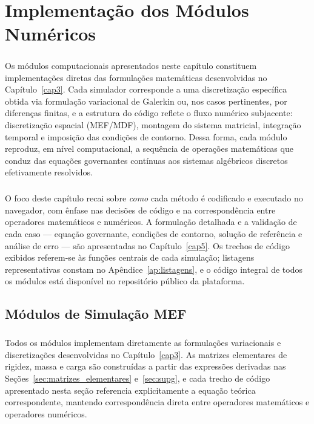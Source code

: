 \chapter{Implementação dos Módulos Numéricos}
\label{cap:implementacao}

\paragraph{}Os módulos computacionais apresentados neste capítulo constituem implementações diretas das formulações matemáticas desenvolvidas no Capítulo~\ref{cap3}. Cada simulador corresponde a uma discretização específica obtida via formulação variacional de Galerkin ou, nos casos pertinentes, por diferenças finitas, e a estrutura do código reflete o fluxo numérico subjacente: discretização espacial (MEF/MDF), montagem do sistema matricial, integração temporal e imposição das condições de contorno. Dessa forma, cada módulo reproduz, em nível computacional, a sequência de operações matemáticas que conduz das equações governantes contínuas aos sistemas algébricos discretos efetivamente resolvidos.

\paragraph{}O foco deste capítulo recai sobre \emph{como} cada método é codificado e executado no navegador, com ênfase nas decisões de código e na correspondência entre operadores matemáticos e numéricos. A formulação detalhada e a validação de cada caso --- equação governante, condições de contorno, solução de referência e análise de erro --- são apresentadas no Capítulo~\ref{cap5}. Os trechos de código exibidos referem-se às funções centrais de cada simulação; listagens representativas constam no Apêndice~\ref{ap:listagens}, e o código integral de todos os módulos está disponível no repositório público da plataforma.

\section{Módulos de Simulação MEF}
\label{sec:modulos_mef}

\paragraph{}Todos os módulos implementam diretamente as formulações variacionais e discretizações desenvolvidas no Capítulo~\ref{cap3}. As matrizes elementares de rigidez, massa e carga são construídas a partir das expressões derivadas nas Seções~\ref{sec:matrizes_elementares} e~\ref{sec:supg}, e cada trecho de código apresentado nesta seção referencia explicitamente a equação teórica correspondente, mantendo correspondência direta entre operadores matemáticos e operadores numéricos.

